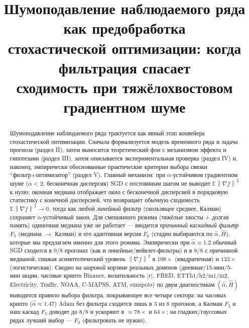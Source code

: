 \documentclass[conference]{IEEEtran}
\theoremstyle{plain}
\theoremstyle{definition}
\newcommand{\E}{\mathbb{E}}
\newcommand{\norm}[1]{\left\lVert#1\right\rVert}
\begin{document}
\title{Шумоподавление наблюдаемого ряда как предобработка\\
стохастической оптимизации: когда фильтрация спасает\\
сходимость при тяжёлохвостовом градиентном шуме}

\author{%
\and
{}
\and
{}
\and
{}
}

\maketitle

\begin{abstract}
Шумоподавление наблюдаемого ряда трактуется как явный этап
конвейера стохастической оптимизации. Сначала формализуется модель
временного ряда и задача прогноза (раздел II), затем выносится
теоретический фон с механизмом эффекта и гипотезами (раздел III), затем
описывается экспериментальная проверка (раздел IV) и, наконец,
эмпирически обоснованные практические критерии выбора связки
``фильтр+оптимизатор'' (раздел V). Главный механизм: при
$\alpha$-устойчивом градиентном шуме ($\alpha<2$, бесконечная
дисперсия) SGD с постоянным шагом не выводит $\E\norm{\nabla f}^2$ к нулю;
оконная медиана отображает окно с бесконечной дисперсией в порядковую
статистику с конечной дисперсией, что возвращает обычную сходимость
$\E\norm{\nabla f}^2\to0$, тогда как любой \emph{линейный} фильтр
(скользящее среднее, Калман)
сохраняет $\alpha$-устойчивый закон. Для смешанного режима
(тяжёлые хвосты + долгая память) одиночная медиана уже не работает ---
вводится \emph{причинный каскадный фильтр} $F_5$ (медиана $\to$
Калман) и его адаптивная версия $F_6$ (стадии выбираются по
$\hat\alpha,\hat H$), которые мы предлагаем именно для этого режима.
Эмпирически при $\hat\alpha\approx1.2$ обычный SGD сходится в $0/8$
прогонах (как и линейные/вейвлет-фильтры) и в $8/8$ с причинной
медианой, снижая асимптотический уровень $\norm{\nabla f}^2$ в $108\times$ (квадратичная) и $133\times$
(логистическая). Сводно на \emph{широкой} корзине реальных доменов
(дневные/15-мин/5-мин акции, часовые крипто Binance, волатильность
$|r|$, FRED, ETTh1/h2/m1/m2, Electricity, Traffic, NOAA, C-MAPSS, ATM,
sunspots) по двум диагностикам $(\hat\alpha,\hat H)$ выводится правило
выбора фильтра, покрывающее все четыре сектора: на часовых крипто
($\hat\alpha\approx1.47$) Adam без фильтра сходится лишь в $3$ из $8$
прогонов, а Калман $F_2$ и наш каскад $F_5$ доводят до $8/8$ и ускоряют
в $\approx78\times$ и $64\times$; на гладких/гауссовых рядах лучший
выбор --- $F_0$ (фильтровать не нужно).
\end{abstract}
\end{document}
